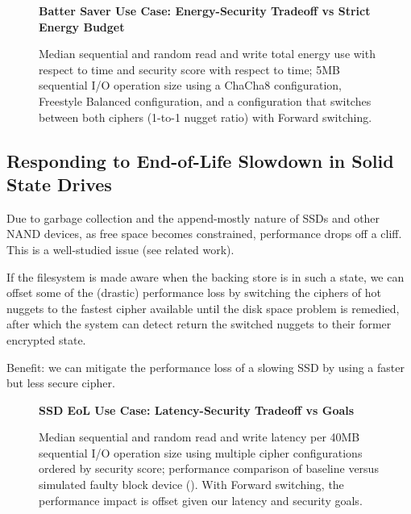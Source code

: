 
\begin{figure}[ht] \textbf{Batter Saver Use Case: Energy-Security Tradeoff vs
   Strict Energy Budget}\par\medskip
   \centering
   {} \caption{Median sequential and random
   read and write total energy use with respect to time and security score with
   respect to time; 5MB sequential I/O operation size using a ChaCha8
   configuration, Freestyle Balanced configuration, and a configuration that
   switches between both ciphers (1-to-1 nugget ratio) with Forward switching.}
  \label{fig:usecase-battery}
\end{figure}

\subsection{Responding to End-of-Life Slowdown in Solid State Drives}

Due to garbage collection and the append-mostly nature of SSDs and other NAND
devices, as free space becomes constrained, performance drops off a cliff. This
is a well-studied issue (see related work).

If the filesystem is made aware when the backing store is in such a state, we
can offset some of the (drastic) performance loss by switching the ciphers of
hot nuggets to the fastest cipher available until the disk space problem is
remedied, after which the system can detect return the switched nuggets to their
former encrypted state.

Benefit: we can mitigate the performance loss of a slowing SSD by using a faster
but less secure cipher.

\begin{figure*}[ht] \textbf{SSD EoL Use Case: Latency-Security Tradeoff vs
   Goals}\par\medskip
   \centering
   {} \caption{Median sequential and
   random read and write latency per 40MB sequential I/O operation size using
   multiple cipher configurations ordered by security score; performance
   comparison of baseline versus simulated faulty block device (). With Forward switching, the performance impact is
   offset given our latency and security goals.}
  \label{fig:usecase-eol-tradeoff}
\end{figure*}

